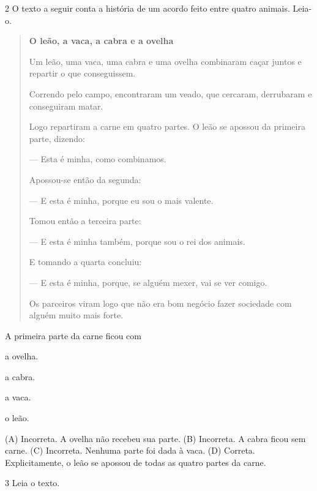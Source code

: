 \num{2} O texto a seguir conta a história de um acordo feito entre quatro
animais. Leia-o.

\begin{quote}
\textbf{O leão, a vaca, a cabra e a ovelha}

Um leão, uma vaca, uma cabra e uma ovelha combinaram
caçar juntos e repartir o que conseguissem.

Correndo pelo campo, encontraram um veado, que
cercaram, derrubaram e conseguiram matar.

Logo repartiram a carne em quatro partes. O leão se
apossou da primeira parte, dizendo:

--- Esta é minha, como combinamos.

Apossou-se então da segunda:

--- E esta é minha, porque eu sou o mais valente.

Tomou então a terceira parte:

--- E esta é minha também, porque sou o rei dos
animais.

E tomando a quarta concluiu:

--- E esta é minha, porque, se alguém mexer, vai se ver
comigo.

Os parceiros viram logo que não era bom negócio fazer
sociedade com alguém muito mais forte.

\end{quote}

A primeira parte da carne ficou com

\begin{escolha}
\item a ovelha.

\item a cabra.

\item a vaca.

\item o leão.
\end{escolha}


(A) Incorreta. A ovelha não recebeu sua parte.
(B) Incorreta. A cabra ficou sem carne.
(C) Incorreta. Nenhuma parte foi dada à vaca.
(D) Correta. Explicitamente, o leão se apossou de todas as quatro partes da carne.

\num{3} Leia o texto.

